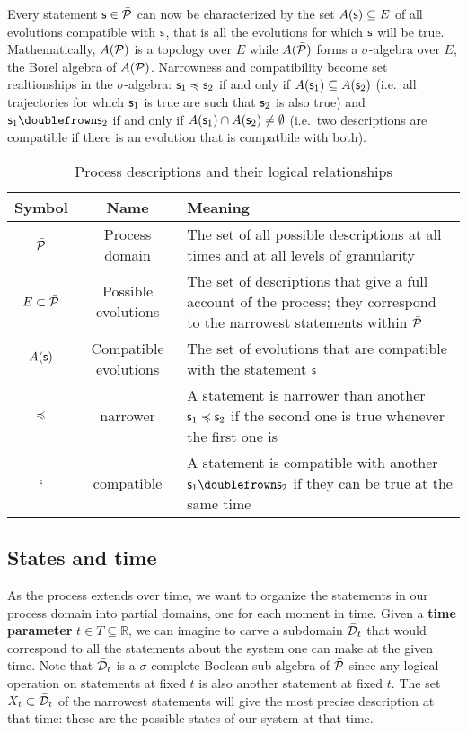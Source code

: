 \documentclass[letterpaper]{article}
\begin{document}
Every statement $\stmt \in \tdomain[P]$ can now be characterized by the set $A(\stmt) \subseteq E$ of all evolutions compatible with $\stmt$, that is all the evolutions for which $\stmt$ will be true. Mathematically,  $A(\edomain[P])$ is a topology over $E$ while $A(\tdomain[P])$ forms a $\sigma$-algebra over $E$, the Borel algebra of $A(\edomain[P])$. Narrowness and compatibility become set realtionships in the $\sigma$-algebra: $\stmt_1 \narrower \stmt_2$ if and only if $A(\stmt_1) \subseteq A(\stmt_2)$ (i.e.~all trajectories for which $\stmt_1$ is true are such that $\stmt_2$ is also true) and $\stmt_1 \comp \stmt_2$ if and only if $A(\stmt_1) \cap A(\stmt_2) \neq \emptyset$ (i.e.~two descriptions are compatible if there is an evolution that is compatbile with both).

\begin{table}[h!]
	\centering
\begin{tabular}[h]{|c|c|p{6cm}|}
	\hline 
	Symbol & Name & Meaning \\ 
	\hline 
	$\tdomain[P]$ & Process domain & The set of all possible descriptions at all times and at all levels of granularity \\ 
	\hline 
	$E \subset \tdomain[P]$ & Possible evolutions & The set of descriptions that give a full account of the process; they correspond to the narrowest statements within $\tdomain[P]$ \\ 
	\hline 
	$A(\stmt)$ & Compatible evolutions & The set of evolutions that are compatible with the statement $\stmt$ \\ 
	\hline 
	$\narrower$ & narrower & A statement is narrower than another $\stmt_1 \narrower \stmt_2$ if the second one is true whenever the first one is \\ 
	\hline 
	$\comp$ & compatible & A statement is compatible with another $\stmt_1 \comp \stmt_2$ if they can be true at the same time \\ 
	\hline 
\end{tabular} 
	\caption{Process descriptions and their logical relationships}
	\label{table:logic}
\end{table}


\subsection{States and time}

As the process extends over time, we want to organize the statements in our process domain into partial domains, one for each moment in time. Given a \textbf{time parameter} $t \in T \subseteq \mathbb{R}$, we can imagine to carve a subdomain $\tdomain_t$ that would correspond to all the statements about the system one can make at the given time. Note that $\tdomain_t$ is a $\sigma$-complete Boolean sub-algebra of $\tdomain[P]$ since any logical operation on statements at fixed $t$ is also another statement at fixed $t$. The set $X_t \subset \tdomain_t$ of the narrowest statements will give the most precise description at that time: these are the possible states of our system at that time.
\end{document}
